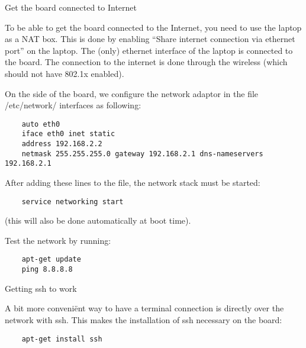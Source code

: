 \begin{myitemize}
\item{Get the board connected to Internet} 

To be able to get the board connected to the Internet, you need to use the laptop as a NAT box. This is done by enabling “Share internet connection via ethernet port” on the laptop. The (only) ethernet interface of the laptop is connected to the board. The connection to the internet is done through the wireless (which should not have 802.1x enabled).



On the side of the board, we configure the network adaptor in the file /etc/network/ interfaces as following:
    \begin{tcolorbox}
    \begin{verbatim}
    auto eth0
    iface eth0 inet static
    address 192.168.2.2
    netmask 255.255.255.0 gateway 192.168.2.1 dns-nameservers 192.168.2.1
    \end{verbatim}
    \end{tcolorbox}

After adding these lines to the file, the network stack must be started: 

\begin{tcolorbox}
    \begin{verbatim}
    service networking start
    \end{verbatim}
\end{tcolorbox}

(this will also be done automatically at boot time).


\item{Test the network by running:}


\begin{tcolorbox}
    \begin{verbatim}
    apt-get update
    ping 8.8.8.8
    \end{verbatim}
\end{tcolorbox}


\item{Getting ssh to work}

A bit more conveniënt way to have a terminal connection is directly over the network with ssh. This makes the installation of ssh necessary on the board:


\begin{tcolorbox}
    \begin{verbatim}
    apt-get install ssh
    \end{verbatim}
\end{tcolorbox}


\end{myitemize}
